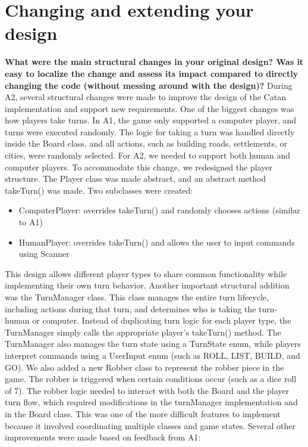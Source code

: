 \section{Changing and extending your design}

\textbf{What were the main structural changes in your original design? Was it easy to localize the change and assess its impact compared to directly changing the code (without messing around with the design)?}\newline\newline
During A2, several structural changes were made to improve the design of the Catan implementation and support new requirements. One of the biggest changes was how players take turns. In A1, the game only supported a computer player, and turns were executed randomly. The logic for taking a turn was handled directly inside the Board class, and all actions, such as building roads, settlements, or cities, were randomly selected. \newline
\newline
For A2, we needed to support both human and computer players. To accommodate this change, we redesigned the player structure. The Player class was made abstract, and an abstract method takeTurn() was made. Two subclasses were created:

\begin{itemize}
    \item ComputerPlayer: overrides takeTurn() and randomly chooses actions (similar to A1)
    \item HumanPlayer: overrides takeTurn() and allows the user to input commands using Scanner
\end{itemize}
This design allows different player types to share common functionality while implementing their own turn behavior. \newline
\newline
Another important structural addition was the TurnManager class. This class manages the entire turn lifecycle, including actions during that turn, and determines who is taking the turn- human or computer. Instead of duplicating turn logic for each player type, the TurnManager simply calls the appropriate player's takeTurn() method. The TurnManager also manages the turn state using a TurnState enum, while players interpret commands using a UserInput enum (such as ROLL, LIST, BUILD, and GO). \newline
\newline
We also added a new Robber class to represent the robber piece in the game. The robber is triggered when certain conditions occur (such as a dice roll of 7). The robber logic needed to interact with both the Board and the player turn flow, which required modifications in the turnManager implementation and in the Board class. This was one of the more difficult features to implement because it involved coordinating multiple classes and game states. \newline
Several other improvements were made based on feedback from A1: 

